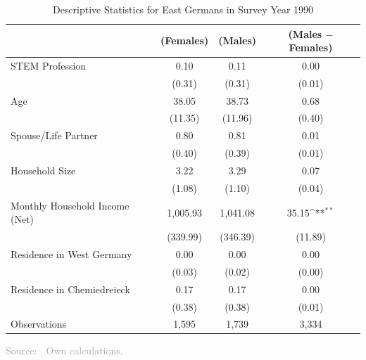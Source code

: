 \documentclass[11pt, aspectratio=1610, xcolor={dvipsnames}]{beamer}
\def\sym#1{\ifmmode^{#1}\else\(^{#1}\)\fi}
\begin{document}
	\begin{frame}
		\frametitle{}
		{\linespread{1}\tiny
			\begin{table}[h]
				\centering
				\caption{Descriptive Statistics for East Germans in Survey Year 1990}
				\label{tab:descriptives}
				\begin{tabular}{l*{3}{c}}
					\toprule
					& (Females) & (Males) & (Males $-$ Females) \\
					\midrule
					STEM Profession     &        0.10&             0.11&          0.00      \\
					&     (0.31)&           (0.31)&           (0.01)\\
					\addlinespace
					Age                 &      38.05&          38.73&        0.68 \\
					&     (11.35)&        (11.96)         &      (0.40)\\
					\addlinespace
					Spouse/Life Partner &        0.80&            0.81&        0.01       \\
					&      (0.40)&          (0.39)&         (0.01)\\
					\addlinespace
					Household Size      &        3.22&         3.29&           0.07        \\
					&          (1.08)&       (1.10)        &      (0.04)\\
					\addlinespace
					Monthly Household Income (Net)&     1,005.93&       1,041.08&      35.15\sym{**} \\
					&    (339.99)&      (346.39)&         (11.89)\\
					\addlinespace
					Residence in West Germany&        0.00&        0.00&         0.00         \\
					&         (0.03)&       (0.02)&          (0.00)\\
					\addlinespace
					Residence in Chemiedreieck&        0.17&        0.17&         0.00     \\
					&          (0.38)&       (0.38)&            (0.01)\\
					\midrule
					Observations        &        1,595&             1,739&            3,334               \\
					\bottomrule
				\end{tabular}
			\end{table}
		}
		
		{\scriptsize
			\textcolor{darkgray}{Source: \cite{SOEP2023}. Own calculations.}
		}
		
	\end{frame}
		
\end{document}
